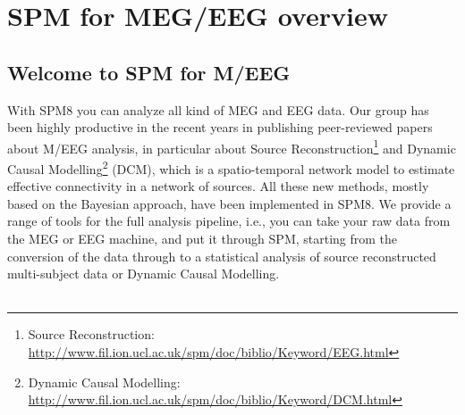 \chapter{SPM for MEG/EEG overview \label{Chap:eeg:overview}}

\section{Welcome to SPM for M/EEG}

With SPM8 you can analyze all kind of MEG and EEG data. Our group has been highly productive in the recent years in publishing peer-reviewed papers about M/EEG analysis, in particular about Source Reconstruction\footnote{Source Reconstruction: \url{http://www.fil.ion.ucl.ac.uk/spm/doc/biblio/Keyword/EEG.html}} and Dynamic Causal Modelling\footnote{Dynamic Causal Modelling: \url{http://www.fil.ion.ucl.ac.uk/spm/doc/biblio/Keyword/DCM.html}} (DCM), which is a spatio-temporal network model to estimate effective connectivity in a network of sources. All these new methods, mostly based on the Bayesian approach, have been implemented in SPM8. We provide a range of tools for the full analysis pipeline, i.e., you can take your raw data from the MEG or EEG machine, and put it through SPM, starting from the conversion of the data through to a statistical analysis of source reconstructed multi-subject data or Dynamic Causal Modelling.
\\
\\
